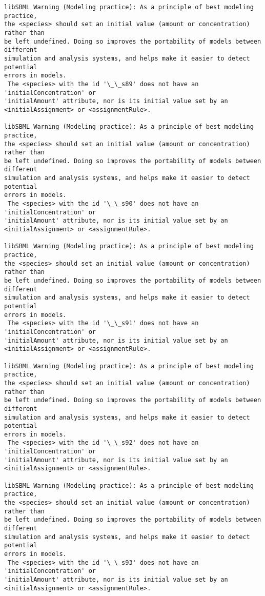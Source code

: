 \documentclass[11pt]{article}
\begin{document}
\begin{Verbatim}[commandchars=\\\{\}]
libSBML Warning (Modeling practice): As a principle of best modeling practice,
the <species> should set an initial value (amount or concentration) rather than
be left undefined. Doing so improves the portability of models between different
simulation and analysis systems, and helps make it easier to detect potential
errors in models.
 The <species> with the id '\_\_s89' does not have an 'initialConcentration' or
'initialAmount' attribute, nor is its initial value set by an
<initialAssignment> or <assignmentRule>.

libSBML Warning (Modeling practice): As a principle of best modeling practice,
the <species> should set an initial value (amount or concentration) rather than
be left undefined. Doing so improves the portability of models between different
simulation and analysis systems, and helps make it easier to detect potential
errors in models.
 The <species> with the id '\_\_s90' does not have an 'initialConcentration' or
'initialAmount' attribute, nor is its initial value set by an
<initialAssignment> or <assignmentRule>.

libSBML Warning (Modeling practice): As a principle of best modeling practice,
the <species> should set an initial value (amount or concentration) rather than
be left undefined. Doing so improves the portability of models between different
simulation and analysis systems, and helps make it easier to detect potential
errors in models.
 The <species> with the id '\_\_s91' does not have an 'initialConcentration' or
'initialAmount' attribute, nor is its initial value set by an
<initialAssignment> or <assignmentRule>.

libSBML Warning (Modeling practice): As a principle of best modeling practice,
the <species> should set an initial value (amount or concentration) rather than
be left undefined. Doing so improves the portability of models between different
simulation and analysis systems, and helps make it easier to detect potential
errors in models.
 The <species> with the id '\_\_s92' does not have an 'initialConcentration' or
'initialAmount' attribute, nor is its initial value set by an
<initialAssignment> or <assignmentRule>.

libSBML Warning (Modeling practice): As a principle of best modeling practice,
the <species> should set an initial value (amount or concentration) rather than
be left undefined. Doing so improves the portability of models between different
simulation and analysis systems, and helps make it easier to detect potential
errors in models.
 The <species> with the id '\_\_s93' does not have an 'initialConcentration' or
'initialAmount' attribute, nor is its initial value set by an
<initialAssignment> or <assignmentRule>.


\end{Verbatim}
\end{document}
